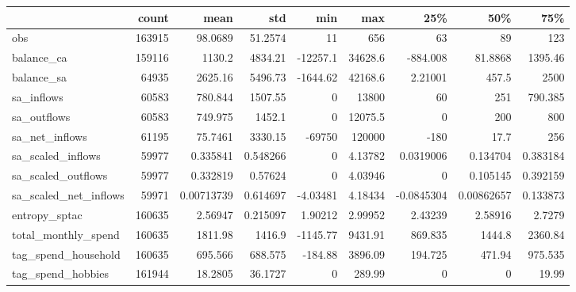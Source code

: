 \begin{tabular}{lrrrrrrrr}
\toprule
                         &   count &           mean &          std &          min &          max &           25\% &            50\% &          75\% \\
\midrule
 obs                     &  163915 &    98.0689     &    51.2574   &     11       &    656       &    63         &    89          &   123        \\
 balance\_ca              &  159116 &  1130.2        &  4834.21     & -12257.1     &  34628.6     &  -884.008     &    81.8868     &  1395.46     \\
 balance\_sa              &   64935 &  2625.16       &  5496.73     &  -1644.62    &  42168.6     &     2.21001   &   457.5        &  2500        \\
 sa\_inflows              &   60583 &   780.844      &  1507.55     &      0       &  13800       &    60         &   251          &   790.385    \\
 sa\_outflows             &   60583 &   749.975      &  1452.1      &      0       &  12075.5     &     0         &   200          &   800        \\
 sa\_net\_inflows          &   61195 &    75.7461     &  3330.15     & -69750       & 120000       &  -180         &    17.7        &   256        \\
 sa\_scaled\_inflows       &   59977 &     0.335841   &     0.548266 &      0       &      4.13782 &     0.0319006 &     0.134704   &     0.383184 \\
 sa\_scaled\_outflows      &   59977 &     0.332819   &     0.57624  &      0       &      4.03946 &     0         &     0.105145   &     0.392159 \\
 sa\_scaled\_net\_inflows   &   59971 &     0.00713739 &     0.614697 &     -4.03481 &      4.18434 &    -0.0845304 &     0.00862657 &     0.133873 \\
 entropy\_sptac           &  160635 &     2.56947    &     0.215097 &      1.90212 &      2.99952 &     2.43239   &     2.58916    &     2.7279   \\
 total\_monthly\_spend     &  160635 &  1811.98       &  1416.9      &  -1145.77    &   9431.91    &   869.835     &  1444.8        &  2360.84     \\
 tag\_spend\_household     &  160635 &   695.566      &   688.575    &   -184.88    &   3896.09    &   194.725     &   471.94       &   975.535    \\
 tag\_spend\_hobbies       &  161944 &    18.2805     &    36.1727   &      0       &    289.99    &     0         &     0          &    19.99     \\

\end{tabular}
